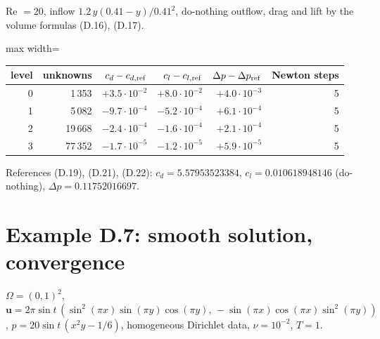 \documentclass[11pt,a4paper]{article}
\newcommand{\bu}{\boldsymbol{u}}
\begin{document}
Re $=20$, inflow $1.2\,y(0.41-y)/0.41^2$, do-nothing outflow, drag and lift by the volume formulas (D.16), (D.17).

\begin{center}\begin{adjustbox}{max width=\textwidth}
\begin{tabular}{rrrrrr}
\toprule
level & unknowns & $c_d-c_{d,\rm ref}$ & $c_l-c_{l,\rm ref}$ & $\Delta p-\Delta p_{\rm ref}$ & Newton steps\\
\midrule
0 & 1\,353 & $+3.5\cdot10^{-2}$ & $+8.0\cdot10^{-2}$ & $+4.0\cdot10^{-3}$ & 5\\
1 & 5\,082 & $-9.7\cdot10^{-4}$ & $-5.2\cdot10^{-4}$ & $+6.1\cdot10^{-4}$ & 5\\
2 & 19\,668 & $-2.4\cdot10^{-4}$ & $-1.6\cdot10^{-4}$ & $+2.1\cdot10^{-4}$ & 5\\
3 & 77\,352 & $-1.7\cdot10^{-5}$ & $-1.2\cdot10^{-5}$ & $+5.9\cdot10^{-5}$ & 5\\
\bottomrule
\end{tabular}
\end{adjustbox}\end{center}
References (D.19), (D.21), (D.22): $c_d=5.57953523384$, $c_l=0.010618948146$ (do-nothing), $\Delta p=0.11752016697$.

\section{Example D.7: smooth solution, convergence}

$\Omega=(0,1)^2$, $\bu=2\pi\sin t\,(\sin^2(\pi x)\sin(\pi y)\cos(\pi y),\,-\sin(\pi x)\cos(\pi x)\sin^2(\pi y))$,
$p=20\sin t\,(x^2y-1/6)$, homogeneous Dirichlet data, $\nu=10^{-2}$, $T=1$.
\end{document}

